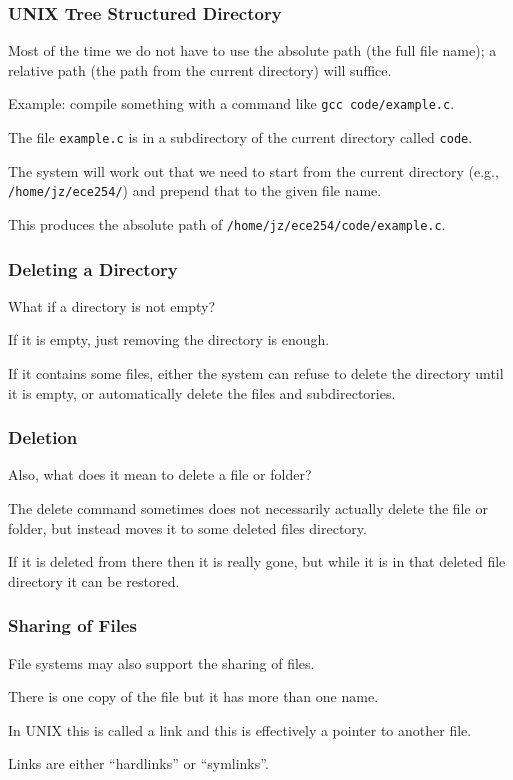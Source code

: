 \begin{frame}
\frametitle{UNIX Tree Structured Directory}

Most of the time we do not have to use the absolute path (the full file name); a relative path (the path from the current directory) will suffice. 

Example: compile something with a command like \texttt{gcc code/example.c}.

The file \texttt{example.c} is in a subdirectory of the current directory called \texttt{code}.

The system will work out that we need to start from the current directory (e.g., \texttt{/home/jz/ece254/}) and prepend that to the given file name.

This produces the absolute path of \texttt{/home/jz/ece254/code/example.c}.

\end{frame}



\begin{frame}
\frametitle{Deleting a Directory}

What if a directory is not empty? 

If it is empty, just removing the directory is enough. 

If it contains some files, either the system can refuse to delete the directory until it is empty, or automatically delete the files and subdirectories. 

\end{frame}

\begin{frame}
\frametitle{Deletion}

Also, what does it mean to delete a file or folder? 

The delete command sometimes does not necessarily actually delete the file or folder, but instead moves it to some deleted files directory. 

If it is deleted from there then it is really gone, but while it is in that deleted file directory it can be restored.



\end{frame}

\begin{frame}
\frametitle{Sharing of Files}

File systems may also support the sharing of files. 

There is one copy of the file but it has more than one name. 

In UNIX this is called a \alert{link} and this is effectively a pointer to another file. 

Links are either ``hardlinks'' or ``symlinks''.

\end{frame}

